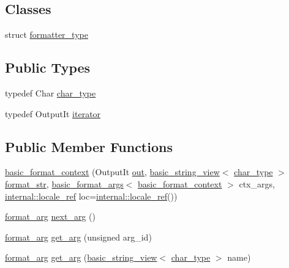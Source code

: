 \subsection*{Classes}
\begin{DoxyCompactItemize}
\item 
struct \hyperlink{structbasic__format__context_1_1formatter__type}{formatter\+\_\+type}
\end{DoxyCompactItemize}
\subsection*{Public Types}
\begin{DoxyCompactItemize}
\item 
typedef Char \hyperlink{classbasic__format__context_ab6b3447e996c0b8117e4f6d98d4e1597}{char\+\_\+type}
\item 
typedef Output\+It \hyperlink{classbasic__format__context_a6486e3c9656c10eb99a4731fb169e51b}{iterator}
\end{DoxyCompactItemize}
\subsection*{Public Member Functions}
\begin{DoxyCompactItemize}
\item 
\hyperlink{classbasic__format__context_a0200f51bac08beeedbb96cbdafe060ec}{basic\+\_\+format\+\_\+context} (Output\+It \hyperlink{classinternal_1_1context__base_ab77c1d5e2cf72ef323e1599be8567fee}{out}, \hyperlink{classbasic__string__view}{basic\+\_\+string\+\_\+view}$<$ \hyperlink{classbasic__format__context_ab6b3447e996c0b8117e4f6d98d4e1597}{char\+\_\+type} $>$ \hyperlink{format_8h_aa2b402011ee0619f2158f13e0827e585}{format\+\_\+str}, \hyperlink{classbasic__format__args}{basic\+\_\+format\+\_\+args}$<$ \hyperlink{classbasic__format__context}{basic\+\_\+format\+\_\+context} $>$ ctx\+\_\+args, \hyperlink{classinternal_1_1locale__ref}{internal\+::locale\+\_\+ref} loc=\hyperlink{classinternal_1_1locale__ref}{internal\+::locale\+\_\+ref}())
\item 
\hyperlink{classbasic__format__arg}{format\+\_\+arg} \hyperlink{classbasic__format__context_a38f34ffad997ca2d16cefc33ab240f89}{next\+\_\+arg} ()
\item 
\hyperlink{classbasic__format__arg}{format\+\_\+arg} \hyperlink{classbasic__format__context_a556848fa995f593aeb9605dcbc62ec76}{get\+\_\+arg} (unsigned arg\+\_\+id)
\item 
\hyperlink{classbasic__format__arg}{format\+\_\+arg} \hyperlink{classbasic__format__context_a251d1e5b73671a838b7937bac2dc6aff}{get\+\_\+arg} (\hyperlink{classbasic__string__view}{basic\+\_\+string\+\_\+view}$<$ \hyperlink{classbasic__format__context_ab6b3447e996c0b8117e4f6d98d4e1597}{char\+\_\+type} $>$ name)
\end{DoxyCompactItemize}
